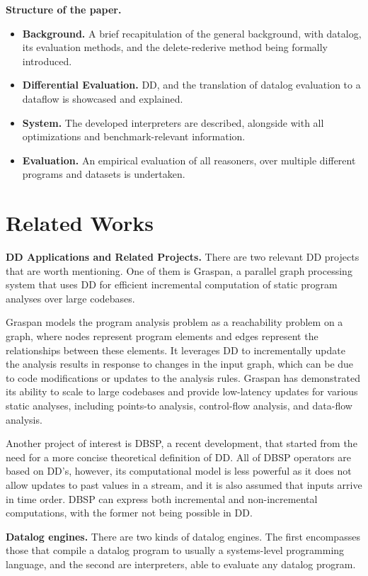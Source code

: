 \documentclass[sigconf,screen,review,natbib]{acmart}
\theoremstyle{definition}
\begin{document}
\textbf{Structure of the paper.}
\begin{itemize}
	\item{\textbf{Background.}} A brief recapitulation of the general background, with datalog, its evaluation
	methods, and the delete-rederive method being formally introduced.
	\item{\textbf{Differential Evaluation.}} DD, and the translation of datalog evaluation to
	a dataflow is showcased and explained.
	\item{\textbf{System.}} The developed interpreters are described, alongside with all optimizations and
	benchmark-relevant information.
	\item{\textbf{Evaluation.}} An empirical evaluation of all reasoners, over multiple different programs and
	datasets is undertaken.
\end{itemize}
\section{Related Works}
\textbf{DD Applications and Related Projects.} There are two relevant DD projects that are worth
mentioning. One of them is Graspan, a parallel graph processing system that uses DD for efficient
incremental computation of static program analyses over large codebases.

Graspan models the program analysis problem as a reachability problem on a graph, where nodes represent program elements
and edges represent the relationships between these elements. It leverages DD to incrementally update
the analysis results in response to changes in the input graph, which can be due to code modifications or updates to
the analysis rules. Graspan has demonstrated its ability to scale to large codebases and provide low-latency updates
for various static analyses, including points-to analysis, control-flow analysis, and data-flow analysis.

Another project of interest is DBSP\cite{dbsp}, a recent development, that started from the need for a more concise
theoretical definition of DD. All of DBSP operators are based on DD's, however, its
computational model is less powerful as it does not allow updates to past values in a stream, and it is also assumed that
inputs arrive in time order. DBSP can express both incremental and non-incremental computations, with the former not being
possible in DD.

\textbf{Datalog engines.} There are two kinds of datalog engines. The first encompasses those that compile
a datalog program to usually a systems-level programming language, and the second are interpreters, able to
evaluate any datalog program.
\end{document}
